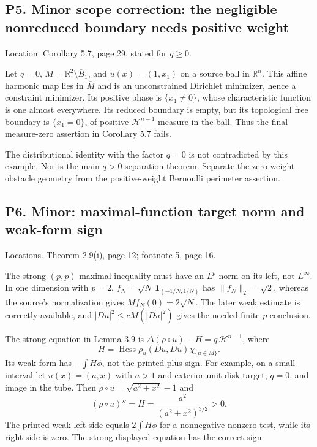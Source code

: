 \documentclass[10pt]{article}
\begin{document}
\subsection*{P5. Minor scope correction: the negligible nonreduced boundary needs positive weight}
Location. Corollary 5.7, page 29, stated for \(q\ge0\).\par
Let \(q=0\), \(M=\mathbb R^2\setminus\overline B_1\), and \(u(x)=(1,x_1)\) on a source ball in \(\mathbb R^n\). This affine harmonic map lies in \(\overline M\) and is an unconstrained Dirichlet minimizer, hence a constraint minimizer. Its positive phase is \(\{x_1\ne0\}\), whose characteristic function is one almost everywhere. Its reduced boundary is empty, but its topological free boundary is \(\{x_1=0\}\), of positive \(\mathcal H^{n-1}\) measure in the ball. Thus the final measure-zero assertion in Corollary 5.7 fails.\par
The distributional identity with the factor \(q=0\) is not contradicted by this example. Nor is the main \(q>0\) separation theorem. Separate the zero-weight obstacle geometry from the positive-weight Bernoulli perimeter assertion.\par
\subsection*{P6. Minor: maximal-function target norm and weak-form sign}
Locations. Theorem 2.9(i), page 12; footnote 5, page 16.\par
The strong \((p,p)\) maximal inequality must have an \(L^p\) norm on its left, not \(L^\infty\). In one dimension with \(p=2\), \(f_N=\sqrt N\,\mathbf1_{(-1/N,1/N)}\) has \(\|f_N\|_2=\sqrt2\), whereas the source’s normalization gives \(Mf_N(0)=2\sqrt N\). The later weak estimate is correctly available, and \(|Du|^2\le cM(|Du|^2)\) gives the needed finite-\(p\) conclusion.\par
The strong equation in Lemma 3.9 is \(\Delta(\rho\circ u)-H=q\,\mathcal H^{n-1}\), where \[H=\operatorname{Hess}\rho_u(Du,Du)\chi_{\{u\in M\}} .\] Its weak form has \(-\int H\phi\), not the printed plus sign. For example, on a small interval let \(u(x)=(a,x)\) with \(a>1\) and exterior-unit-disk target, \(q=0\), and image in the tube. Then \(\rho\circ u=\sqrt{a^2+x^2}-1\) and \[(\rho\circ u)''=H=\frac{a^2}{(a^2+x^2)^{3/2}}>0 .\] The printed weak left side equals \(2\int H\phi\) for a nonnegative nonzero test, while its right side is zero. The strong displayed equation has the correct sign.\par
\end{document}
